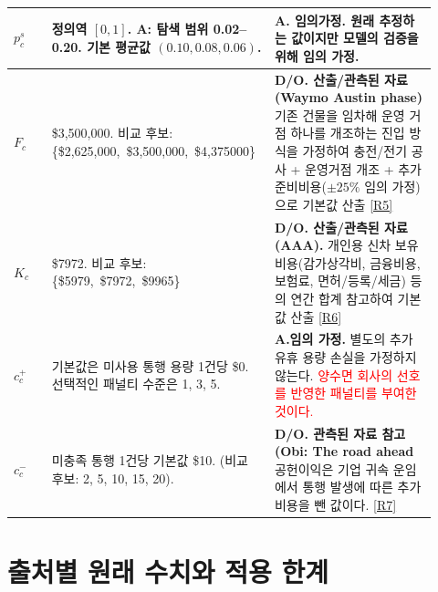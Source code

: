 \documentclass[10pt,a4paper]{article}
\begin{document}
\begin{longtable}{P{0.10\linewidth}P{0.34\linewidth}P{0.48\linewidth}}
$p_c^s$ & 정의역 $[0,1]$. A: 탐색 범위 0.02--0.20. 기본 평균값 $(0.10,0.08,0.06)$. & \textbf{A. 임의가정.} 원래 추정하는 값이지만 모델의 검증을 위해 임의 가정. \\ \midrule

$F_c$ & \$3,500,000.  비교 후보: \{\$2,625,000,\ \$3,500,000,\ \$4,375000\}\ & \textbf{D/O. 산출/관측된 자료 (Waymo Austin phase)} 기존 건물을 임차해 운영 거점 하나를 개조하는 진입 방식을 가정하여 충전/전기 공사 + 운영거점 개조 + 추가 준비비용($\pm25\%$ 임의 가정)으로 기본값 산출 \hyperlink{rationale-R5}{[R5]} \\ \midrule

$K_c$ & \$7972. 비교 후보: \{\$5979,\ \$7972,\ \$9965\}\  & \textbf{D/O. 산출/관측된 자료 (AAA).} 개인용 신차 보유 비용(감가상각비, 금융비용, 보험료, 면허/등록/세금) 등의 연간 합계 참고하여 기본값 산출 \hyperlink{rationale-R6}{[R6]} \\ \midrule

$c_c^+$ & 기본값은 미사용 통행 용량 1건당 \$0. 선택적인 패널티 수준은 1, 3, 5. & \textbf{A.임의 가정.} 별도의 추가 유휴 용량 손실을 가정하지 않는다. \textcolor{red}{양수면 회사의 선호를 반영한 패널티를 부여한 것이다.} \\ \midrule

$c_c^-$ & 미충족 통행 1건당 기본값 \$10. (비교 후보: 2, 5, 10, 15, 20). & \textbf{D/O. 관측된 자료 참고 (Obi: The road ahead} 공헌이익은 기업 귀속 운임에서 통행 발생에 따른 추가 비용을 뺀 값이다. \hyperlink{rationale-R7}{[R7]} \\ \midrule

\bottomrule
\end{longtable}
\normalsize

\section{출처별 원래 수치와 적용 한계}
\end{document}

